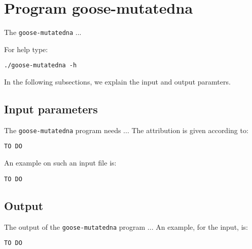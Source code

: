 \section{Program goose-mutatedna}
The \texttt{goose-mutatedna} ...

For help type:
\begin{lstlisting}
./goose-mutatedna -h
\end{lstlisting}
In the following subsections, we explain the input and output paramters.

\subsection{Input parameters}

The \texttt{goose-mutatedna} program needs ...
The attribution is given according to:
\begin{lstlisting}
TO DO
\end{lstlisting}

An example on such an input file is:
\begin{lstlisting}
TO DO
\end{lstlisting}

\subsection{Output}
The output of the \texttt{goose-mutatedna} program ...
An example, for the input, is:
\begin{lstlisting}
TO DO
\end{lstlisting}